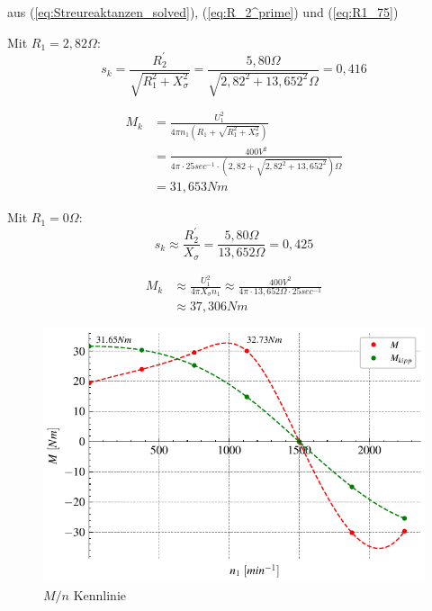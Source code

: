 \documentclass[conference]{IEEEtran}
\begin{document}
aus (\ref{eq:Streureaktanzen_solved}), (\ref{eq:R_2^prime}) und (\ref{eq:R1_75})

\smallskip
Mit $R_1 = 2,82\Omega$:
\begin{equation} \label{eq:s_k-mit-R_1}
    s_k = \frac{R_2^{\prime}}{\sqrt{R_{1}^{2} + X_{\sigma}^{2}}} = \frac{5,80\Omega}{\sqrt{2,82^2+13,652^2}\Omega} = 0,416
\end{equation}

\begin{align}
    M_{k} & = \frac{U_{1}^{2}}{4 \pi n_{1} \left(R_{1} + \sqrt{R_{1}^{2} + X_{\sigma}^{2}}\right)}           \\
          & = \frac{400\si{V}^{2}}{4 \pi \cdot 25 \si{sec^{-1}} \cdot (2,82 + \sqrt{2,82^2+13,652^2})\Omega} \\
          & = 31,653 \si{Nm}
    \label{eq:M_k-mit-R_1}
\end{align}

\smallskip
Mit $R_1 = 0\Omega$:
\begin{equation} \label{eq:s_k-naehrung}
    s_k \approx \frac{R_2^{\prime}}{X_{\sigma}} = \frac{5,80\Omega}{13,652\Omega} = 0,425
\end{equation}

\begin{align}
    M_{k} & \approx \frac{U_{1}^{2}}{4 \pi X_{\sigma} n_{1}} \approx \frac{400\si{V}^{2}}{4 \pi\cdot 13,652 \Omega \cdot 25 \si{sec^{-1}}} \\
          & \approx 37,306 \si{Nm}
    \label{eq:M_k-mit-R_1}
\end{align}




\begin{figure}[htbp]
    \centering
    \includegraphics[width=\columnwidth]{./figures/m_n-kennlinie.pdf}
    \caption{$M/n$ Kennlinie}
    \label{fig:trennung_von_eisen_reib}
\end{figure}
\end{document}
